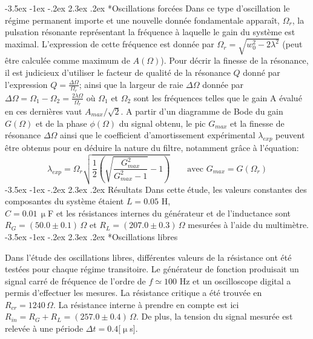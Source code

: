 \documentclass[a4paper, 12pt,oneside]{article}
\makeatletter
\renewcommand{\section}{\@startsection {section}{1}{\z@}%
             {-3.5ex \@plus -1ex \@minus -.2ex}%
             {2.3ex \@plus.2ex}%
             {\normalfont\normalsize\bfseries}}
\renewcommand{\subsection}{\@startsection {subsection}{1}{\z@}%
             {-3.5ex \@plus -1ex \@minus -.2ex}%
             {2.3ex \@plus.2ex}%
             {\normalfont\normalsize\bfseries}}
\makeatother
\begin{document}
\subsection*{Oscillations forcées}
\vspace{-0.1cm}
Dans ce type d'oscillation le régime permanent importe et une nouvelle donnée fondamentale 
 apparaît, $\Omega_r$, la pulsation résonante représentant la fréquence à laquelle le gain du système est maximal. L'expression de cette fréquence est donnée par $\Omega_r = \sqrt{w_0^2-2\lambda^2}$ (peut être calculée comme maximum de $A(\Omega)$). Pour décrir la finesse de la résonance, il est judicieux d'utiliser le facteur de qualité de la résonance $Q$ donné par l'expression $Q = \frac{\Delta\Omega}{\Omega_r}$; ainsi que la largeur de raie $\Delta\Omega$ donnée par $\Delta\Omega = \Omega_1-\Omega_2 = \frac{2\lambda\Omega}{\Omega_r}$ où $\Omega_1$ et $\Omega_2$ sont les fréquences telles que le gain A évalué en ces dernières vaut $A_{max}/\sqrt{2}$. A partir d'un diagramme de Bode du gain $G(\Omega)$ et de la phase $\phi(\Omega)$ du signal obtenu, le pic $G_{max}$ et la finesse de résonance $\Delta\Omega$ ainsi que le coefficient d'amortissement expérimental $\lambda_{exp}$ peuvent être obtenus pour en déduire la nature du filtre, notamment grâce à l'équation:
\vspace{-0.1cm}
\begin{equation}
\lambda_{exp}=\Omega_r \sqrt{\frac{1}{2}\left(\sqrt{\frac{G_{max}^2}{G_{max}^2-1}}-1\right)}\qquad \text{avec $G_{max} = G(\Omega_r)$}
\label{eq_lambda}
\end{equation}
 \vspace{-0.5cm}
\section{Résultats}
Dans cette étude, les valeurs constantes des composantes du système étaient $L = 0.05$ H,\\
$ C = 0.01 \,\upmu$F et les résistances internes du générateur et de l'inductance sont $R_G = (50.0 \pm 0.1)\,\Omega$ et $R_L = (207.0 \pm 0.3)\,\Omega$ mesurées à l'aide du multimètre.
\subsection*{Oscillations libres}

Dans l'étude des oscillations libres, différentes valeurs de la résistance ont été testées pour chaque régime transitoire. Le générateur de fonction produisait un signal carré de fréquence de l'ordre de $ f \simeq 100$ Hz et un oscilloscope digital a permis d'effectuer les mesures. La résistance critique a été trouvée en $R_{cr} = 1240\,\Omega$. La résistance interne à prendre en compte est ici $R_{in} = R_G+R_L = (257.0\pm0.4)\,\Omega$. De plus, la tension du signal mesurée est relevée à une période $\Delta t = 0.4 [\upmu$s].\\
\end{document}
